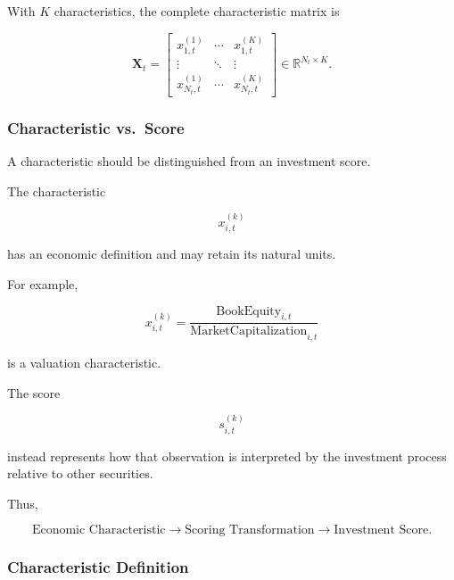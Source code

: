 \documentclass[11pt,a4paper]{article}
\begin{document}
With $K$ characteristics, the complete characteristic matrix is

\begin{equation}
\boxed{
\mathbf{X}_t
=
\begin{bmatrix}
x_{1,t}^{(1)} & \cdots & x_{1,t}^{(K)}
\\
\vdots & \ddots & \vdots
\\
x_{N_t,t}^{(1)} & \cdots & x_{N_t,t}^{(K)}
\end{bmatrix}
\in
\mathbb{R}^{N_t\times K}.
}
\end{equation}


\subsubsection{Characteristic vs.\ Score}

A characteristic should be distinguished from an investment score.

The characteristic

\begin{equation}
x_{i,t}^{(k)}
\end{equation}

has an economic definition and may retain its natural units.

For example,

\begin{equation}
x_{i,t}^{(k)}
=
\frac{
\mathrm{BookEquity}_{i,t}
}{
\mathrm{MarketCapitalization}_{i,t}
}
\end{equation}

is a valuation characteristic.

The score

\begin{equation}
s_{i,t}^{(k)}
\end{equation}

instead represents how that observation is interpreted by the investment
process relative to other securities.

Thus,

\begin{equation}
\boxed{
\text{Economic Characteristic}
\rightarrow
\text{Scoring Transformation}
\rightarrow
\text{Investment Score}.
}
\end{equation}


\subsubsection{Characteristic Definition}
\end{document}
